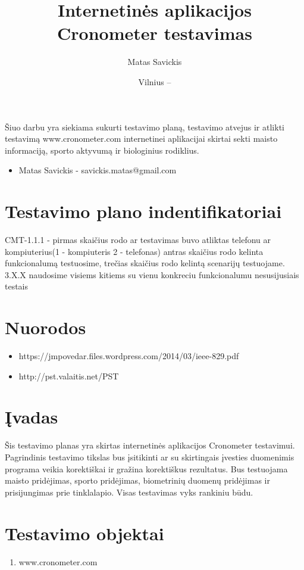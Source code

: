 \documentclass[oneside]{VUMIFPSkursinis}
\title{Internetinės aplikacijos Cronometer testavimas}
\author{Matas Savickis}
\date{Vilnius – \the\year}
\begin{document}
\maketitle

Šiuo darbu yra siekiama sukurti testavimo planą, testavimo atvejus ir atlikti testavimą www.cronometer.com  internetinei aplikacijai skirtai sekti maisto informaciją, sporto aktyvumą ir biologinius rodiklius.

\begin{itemize}
	\item{Matas Savickis - savickis.matas@gmail.com}
\end{itemize}

\tableofcontents


\section{Testavimo plano indentifikatoriai} CMT-1.1.1 - pirmas skaičius rodo ar testavimas buvo atliktas telefonu ar kompiuterius(1 - kompiuteris 2 - telefonas) antras skaičius rodo kelinta funkcionalumą testuosime, trečias skaičius rodo kelintą scenarijų testuojame. 3.X.X naudosime visiems kitiems su vienu konkreciu funkcionalumu nesusijusiais testais
\section{Nuorodos}
	\begin{itemize}
		\item{https://jmpovedar.files.wordpress.com/2014/03/ieee-829.pdf}
		\item{http://pst.valaitis.net/PST}
	\end{itemize}
\section{Įvadas}
	Šis testavimo planas yra skirtas internetinės aplikacijos Cronometer testavimui. Pagrindinis testavimo tikslas bus įsitikinti ar su skirtingais įvesties duomenimis programa veikia korektiškai ir gražina korektiškus rezultatus. Bus testuojama maisto pridėjimas, sporto pridėjimas, biometrinių duomenų pridėjimas ir prisijungimas prie tinklalapio. Visas testavimas vyks rankiniu būdu.

\section{Testavimo objektai}
	\begin{enumerate}
		\item{www.cronometer.com}
	\end{enumerate}
\end{document}
